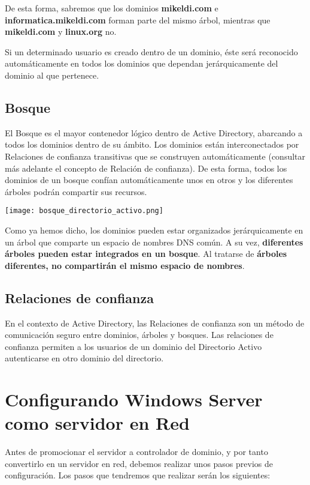De esta forma, sabremos que los dominios \textbf{mikeldi.com} e \textbf{informatica.mikeldi.com} forman parte del mismo árbol, mientras que \textbf{mikeldi.com} y \textbf{linux.org} no.

Si un determinado usuario es creado dentro de un dominio, éste será reconocido automáticamente en todos los dominios que dependan jerárquicamente del dominio al que pertenece.


\subsection{Bosque}
El Bosque es el mayor contenedor lógico dentro de Active Directory, abarcando a todos los dominios dentro de su ámbito. Los dominios están interconectados por Relaciones de confianza transitivas que se construyen automáticamente (consultar más adelante el concepto de Relación de confianza). De esta forma, todos los dominios de un bosque confían automáticamente unos en otros y los diferentes árboles podrán compartir sus recursos.

\begin{center}
    \vspace{-15pt}
    \texttt{[image: bosque\_directorio\_activo.png]}
    \vspace{-15pt}
\end{center}

Como ya hemos dicho, los dominios pueden estar organizados jerárquicamente en un árbol que comparte un espacio de nombres DNS común. A su vez, \textbf{diferentes árboles pueden estar integrados en un bosque}. Al tratarse de \textbf{árboles diferentes, no compartirán el mismo espacio de nombres}.

\subsection{Relaciones de confianza}
En el contexto de Active Directory, las Relaciones de confianza son un método de comunicación seguro entre dominios, árboles y bosques. Las relaciones de confianza permiten a los usuarios de un dominio del Directorio Activo autenticarse en otro dominio del directorio.


\section{Configurando Windows Server como servidor en Red}
Antes de promocionar el servidor a controlador de dominio, y por tanto convertirlo en un servidor en red, debemos realizar unos pasos previos de configuración. Los pasos que tendremos que realizar serán los siguientes:

